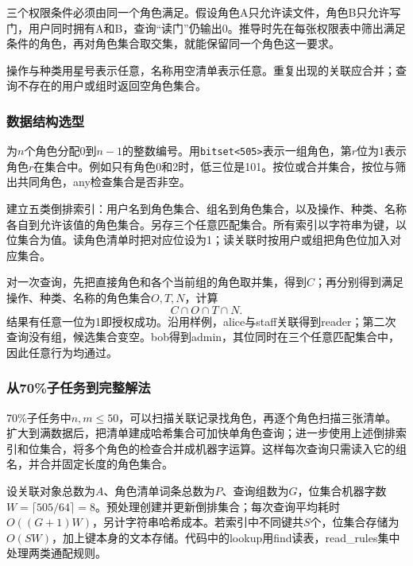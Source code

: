 \documentclass[UTF8,11pt,a4paper,fontset=none]{ctexart}
\begin{document}
三个权限条件必须由同一个角色满足。假设角色A只允许读文件，角色B只允许写门，用户同时拥有A和B，查询“读门”仍输出0。推导时先在每张权限表中筛出满足条件的角色，再对角色集合取交集，就能保留同一个角色这一要求。

操作与种类用星号表示任意，名称用空清单表示任意。重复出现的关联应合并；查询不存在的用户或组时返回空角色集合。

\subsubsection{数据结构选型}
为$n$个角色分配0到$n-1$的整数编号。用\texttt{bitset<505>}表示一组角色，第$r$位为1表示角色$r$在集合中。例如只有角色0和2时，低三位是101。按位或合并集合，按位与筛出共同角色，any检查集合是否非空。

建立五类倒排索引：用户名到角色集合、组名到角色集合，以及操作、种类、名称各自到允许该值的角色集合。另存三个任意匹配集合。所有索引以字符串为键，以位集合为值。读角色清单时把对应位设为1；读关联时按用户或组把角色位加入对应集合。

对一次查询，先把直接角色和各个当前组的角色取并集，得到$C$；再分别得到满足操作、种类、名称的角色集合$O,T,N$，计算
\[
C\cap O\cap T\cap N.
\]
结果有任意一位为1即授权成功。沿用样例，alice与staff关联得到reader；第二次查询没有组，候选集合变空。bob得到admin，其位同时在三个任意匹配集合中，因此任意行为均通过。

\subsubsection{从70\%子任务到完整解法}
70\%子任务中$n,m\le50$，可以扫描关联记录找角色，再逐个角色扫描三张清单。扩大到满数据后，把清单建成哈希集合可加快单角色查询；进一步使用上述倒排索引和位集合，将多个角色的检查合并成机器字运算。这样每次查询只需读入它的组名，并合并固定长度的角色集合。

设关联对象总数为$A$、角色清单词条总数为$P$、查询组数为$G$，位集合机器字数$W=\lceil505/64\rceil=8$。预处理创建并更新倒排集合；每次查询平均耗时$O((G+1)W)$，另计字符串哈希成本。若索引中不同键共$S$个，位集合存储为$O(SW)$，加上键本身的文本存储。代码中的lookup用find读表，read\_rules集中处理两类通配规则。
\end{document}
